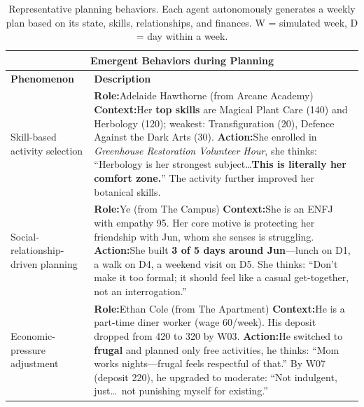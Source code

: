 \begin{table}[t]
  \centering
  \small
  \caption{Representative planning behaviors. Each agent autonomously generates a weekly plan based on its state, skills, relationships, and finances. W = simulated week, D = day within a week.}
  \label{tab:planning}
  \begin{tabular}{p{0.8in}p{4.3in}}
  \toprule
  \multicolumn{2}{c}{\textbf{Emergent Behaviors during Planning}} \\
  \midrule
  \textbf{Phenomenon} & \textbf{Description} \\
  \midrule
  
  Skill-based \newline activity \newline selection
  &
  \textbf{Role:}\quad Adelaide Hawthorne \hfill (from Arcane Academy) \newline
  \textbf{Context:}\quad Her \textbf{top skills} are Magical Plant Care (140) and Herbology (120); weakest: Transfiguration (20), Defence Against the Dark Arts (30). \newline
  \textbf{Action:}\quad She enrolled in \emph{Greenhouse Restoration Volunteer Hour}, she thinks: ``Herbology is her strongest subject\ldots \textbf{This is literally her comfort zone.}'' The activity further improved her botanical skills.
  \\
  \midrule
  
  Social-\newline relationship-\newline driven \newline planning
  &
  \textbf{Role:}\quad Ye \hfill (from The Campus) \newline
  \textbf{Context:}\quad She is an ENFJ with empathy 95. Her core motive is protecting her friendship with Jun, whom she senses is struggling. \newline
  \textbf{Action:}\quad She built \textbf{3 of 5 days around Jun}---lunch on D1, a walk on D4, a weekend visit on D5. She thinks: ``Don't make it too formal; it should feel like a casual get-together, not an interrogation.''
  \\
  \midrule
  
  Economic-\newline pressure \newline adjustment
  &
  \textbf{Role:}\quad Ethan Cole \hfill (from The Apartment) \newline
  \textbf{Context:}\quad He is a part-time diner worker (wage 60/week). His deposit dropped from 420 to 320 by W03. \newline
  \textbf{Action:}\quad He switched to \textbf{frugal} and planned only free activities, he thinks: ``Mom works nights---frugal feels respectful of that.'' By W07 (deposit 220), he upgraded to moderate: ``Not indulgent, just\ldots\ not punishing myself for existing.''
  \\
  \midrule
  

\end{tabular}
\end{table}
